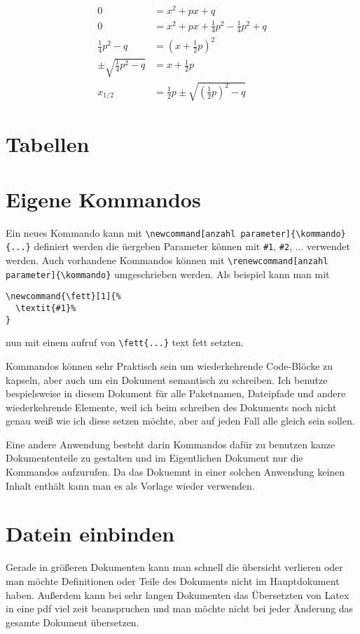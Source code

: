 \documentclass[a4paper, parskip=half]{scrartcl}
\begin{document}
\begin{align}
  0                  &= x^2 + px + q \\
  0                  &= x^2 + px + \frac{1}{4}p^2 - \frac{1}{4}p^2 + q \\
  \frac{1}{4}p^2 - q &= \left(x + \frac{1}{2}p \right)^2 \\
  \pm \sqrt{ \frac{1}{4}p^2 - q} &= x + \frac{1}{2}p \\
  x_{1/2}            &= \frac{1}{2}p \pm \sqrt{\left(\frac{1}{2}p\right)^2 - q}  
\end{align}
\section{Tabellen}
\section{Eigene Kommandos}\label{sec:customCommands}
Ein neues Kommando kann mit \verb+\newcommand[anzahl parameter]{\kommando}{...}+ definiert werden
die üergeben Parameter können mit \verb+#1+, \verb+#2+, ... verwendet werden. Auch vorhandene Kommandos
können mit \verb+\renewcommand[anzahl parameter]{\kommando}+ umgeschrieben werden. Als beispiel kann man mit
\begin{verbatim}
\newcommand{\fett}[1]{%
  \textit{#1}%
}
\end{verbatim}
nun mit einem aufruf von \verb+\fett{...}+ text fett setzten.

Kommandos können sehr Praktisch sein um wiederkehrende Code-Blöcke zu kapseln, aber auch um ein Dokument
semantisch zu schreiben. Ich benutze bespielsweise in diesem Dokument für alle Paketnamen, Dateipfade und
andere wiederkehrende Elemente, weil ich beim schreiben des Dokuments noch nicht genau weiß wie ich diese
setzen möchte, aber auf jeden Fall alle gleich sein sollen. 

Eine andere Anwendung besteht darin Kommandos dafür zu benutzen kanze Dokumententeile zu gestalten und im
Eigentlichen Dokument nur die Kommandos aufzurufen. Da das Dokuemnt in einer solchen Anwendung keinen Inhalt
enthält kann man es als Vorlage wieder verwenden. 
\section{Datein einbinden}
Gerade in größeren Dokumenten kann man schnell die übersicht verlieren oder man möchte Definitionen oder
Teile des Dokuments nicht im Hauptdokument haben. Außerdem kann bei sehr langen Dokumenten das Übersetzten
von Latex in eine pdf viel zeit beanspruchen und man möchte nicht bei jeder Änderung das gesamte Dokument
übersetzen. 
\end{document}
